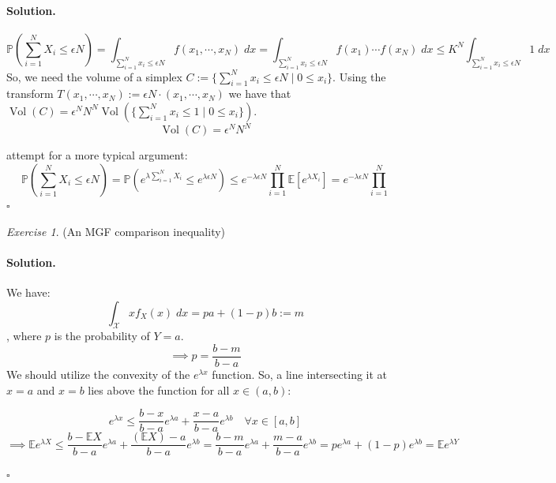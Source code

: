 \documentclass[11pt]{article}
\theoremstyle{definition}
\theoremstyle{remark}
\newtheorem{exercise}{Exercise}[section]
\newenvironment{solution}{\paragraph{Solution.}}{\hfill$\square$\medskip}
\newcommand{\E}{\mathbb{E}}
\newcommand{\Prob}{\mathbb{P}}
\newcommand{\1}{\mathbf{1}}
\newcommand{\Vol}{\operatorname{Vol}}
\begin{document}
\begin{solution}
	
	\[
	\Prob(\sum_{i=1}^{N} X_i \leq \epsilon N) = \int_{\sum_{i=1}^{N} x_i \leq \epsilon N} f(x_1, \cdots, x_N) \;dx = \int_{\sum_{i=1}^{N} x_i \leq \epsilon N} f(x_1) \cdots f(x_N) \;dx \leq K^N \int_{\sum_{i=1}^{N} x_i \leq \epsilon N} 1 \;dx
	\]
	So, we need the volume of a simplex \(C := \{\sum_{i=1}^{N} x_i \leq \epsilon N \mid 0 \leq x_i\}\). Using the transform \(T(x_1,\cdots,x_N):=\epsilon N \cdot (x_1,\cdots, x_N)\) we have that \(\Vol(C) = \epsilon^NN^N \Vol( \{\sum_{i=1}^{N} x_i \leq 1 \mid 0 \leq x_i\} )\). 
	\[
	\Vol(C) = \epsilon^NN^N 
	\]
	
	\bigskip
	
	attempt for a more typical argument:
	\[
	\Prob(\sum_{i=1}^{N} X_i \leq \epsilon N ) = \Prob( e^{\lambda \sum_{i=1}^{N} X_i} \leq e^{\lambda \epsilon N} ) \leq e^{-\lambda \epsilon N} \prod_{i=1}^{N} \E[ e^{\lambda X_i} ] = e^{-\lambda \epsilon N} \prod_{i=1}^{N}
	\]
\end{solution}

\begin{exercise}
	(An MGF comparison inequality)
\end{exercise}

\begin{solution}
	
	We have:
	\[
	\int_\mathcal{X} x f_X(x)\; dx = pa + (1-p)b := m
	\], where \(p\) is the probability of \(Y=a\).
	\[
	\implies p = \frac{b-m}{b-a}
	\]
	We should utilize the convexity of the \(e^{\lambda x}\) function. So, a line intersecting it at \(x=a\) and \(x=b\) lies above the function for all \(x\in(a,b)\):
	
	\[
	e^{\lambda x} \leq \frac{b-x}{b-a} e^{\lambda a} + \frac{x-a}{b-a} e^{\lambda b} \quad \forall x\in [a,b]
	\]
	\[
	\implies \E e^{\lambda X} \leq \frac{b-\E X}{b-a} e^{\lambda a} + \frac{(\E X)-a}{b-a} e^{\lambda b} = \frac{b-m}{b-a} e^{\lambda a} + \frac{m -a}{b-a} e^{\lambda b} = p e^{\lambda a} + (1-p)e^{\lambda b} = \E e^{\lambda Y}
	\]
	
	
%	

\end{solution}
	
\end{document}
